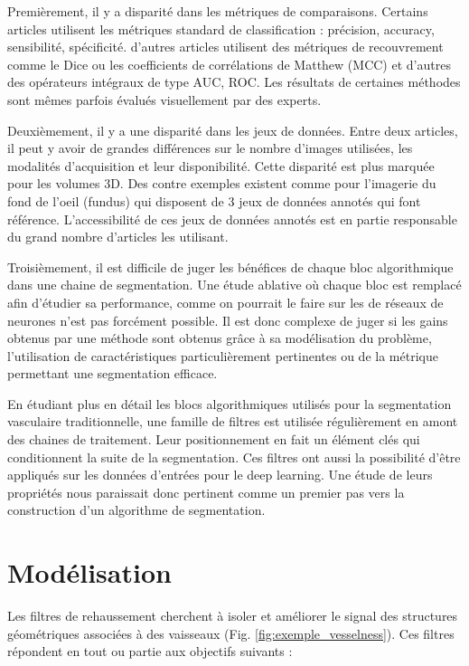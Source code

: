     Premièrement, il y a disparité dans les métriques de comparaisons. Certains articles utilisent les métriques standard de classification : précision, accuracy, sensibilité, spécificité. d'autres articles utilisent des métriques de recouvrement comme le Dice ou les coefficients de corrélations de Matthew (MCC) et d'autres des opérateurs intégraux de type AUC, ROC. Les résultats de certaines méthodes sont mêmes parfois évalués visuellement par des experts.

    Deuxièmement, il y a une disparité dans les jeux de données. Entre deux articles, il peut y avoir de grandes différences sur le nombre d'images utilisées, les modalités d'acquisition et leur disponibilité. Cette disparité est plus marquée pour les volumes 3D. Des contre exemples existent comme pour l'imagerie du fond de l'oeil (fundus) qui disposent de 3 jeux de données annotés qui font référence. L'accessibilité de ces jeux de données annotés est en partie responsable du grand nombre d'articles les utilisant.

    Troisièmement, il est difficile de juger les bénéfices de chaque bloc algorithmique dans une chaine de segmentation. Une étude ablative où chaque bloc est remplacé afin d'étudier sa performance, comme on pourrait le faire sur les de réseaux de neurones n'est pas forcément possible. Il est donc complexe de juger si les gains obtenus par une méthode sont obtenus grâce à sa modélisation du problème, l'utilisation de caractéristiques particulièrement pertinentes ou de la métrique permettant une segmentation efficace.

    En étudiant plus en détail les blocs algorithmiques utilisés pour la segmentation vasculaire traditionnelle, une famille de filtres est utilisée régulièrement en amont des chaines de traitement. Leur positionnement en fait un élément clés qui conditionnent la suite de la segmentation. Ces filtres ont aussi la possibilité d'être appliqués sur les données d'entrées pour le deep learning. Une étude de leurs propriétés nous paraissait donc pertinent comme un premier pas vers la construction d'un algorithme de segmentation.


  \section{Modélisation}

  Les filtres de rehaussement cherchent à isoler et améliorer le signal des structures géométriques associées à des vaisseaux (Fig. \ref{fig:exemple_vesselness}). Ces filtres répondent en tout ou partie aux objectifs suivants :

